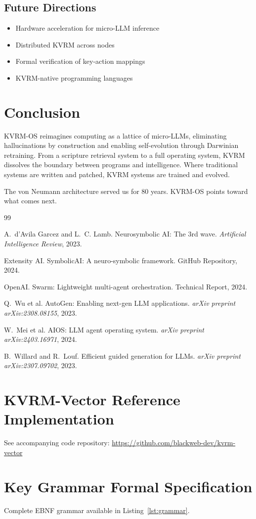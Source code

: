 \documentclass[11pt,a4paper]{article}
\begin{document}
\subsection{Future Directions}

\begin{itemize}
    \item Hardware acceleration for micro-LLM inference
    \item Distributed KVRM across nodes
    \item Formal verification of key-action mappings
    \item KVRM-native programming languages
\end{itemize}

\section{Conclusion}

KVRM-OS reimagines computing as a lattice of micro-LLMs, eliminating hallucinations by construction and enabling self-evolution through Darwinian retraining. From a scripture retrieval system to a full operating system, KVRM dissolves the boundary between programs and intelligence. Where traditional systems are written and patched, KVRM systems are trained and evolved.

The von Neumann architecture served us for 80 years. KVRM-OS points toward what comes next.

\begin{thebibliography}{99}

A.~d'Avila Garcez and L.~C. Lamb.
\newblock Neurosymbolic AI: The 3rd wave.
\newblock \emph{Artificial Intelligence Review}, 2023.

Extensity AI.
\newblock SymbolicAI: A neuro-symbolic framework.
\newblock GitHub Repository, 2024.

OpenAI.
\newblock Swarm: Lightweight multi-agent orchestration.
\newblock Technical Report, 2024.

Q.~Wu et al.
\newblock AutoGen: Enabling next-gen LLM applications.
\newblock \emph{arXiv preprint arXiv:2308.08155}, 2023.

W.~Mei et al.
\newblock AIOS: LLM agent operating system.
\newblock \emph{arXiv preprint arXiv:2403.16971}, 2024.

B.~Willard and R.~Louf.
\newblock Efficient guided generation for LLMs.
\newblock \emph{arXiv preprint arXiv:2307.09702}, 2023.

\end{thebibliography}

\appendix

\section{KVRM-Vector Reference Implementation}

See accompanying code repository: \url{https://github.com/blackweb-dev/kvrm-vector}

\section{Key Grammar Formal Specification}

Complete EBNF grammar available in Listing~\ref{lst:grammar}.
\end{document}
